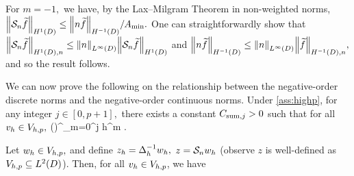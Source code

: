 For $m=-1,$ we have, by the Lax--Milgram Theorem in non-weighted norms, $\NHoD{\Sn \ftilde} \leq \NHmoD{n\ftilde}/\Amin.$ One can straightforwardly show that $\NHnfn{1}{D}{\Sn \ftilde} \leq \NLiD{n} \NHoD{\Sn \ftilde}$ and $\NHmoD{n\ftilde} \leq \NLiD{n} \NHnfn{-1}{D}{\ftilde},$ and so the result follows.
\epf



We can now prove the following  on the relationship between the negative-order discrete norms and the negative-order continuous norms.
\label{lem:negdiscsum}
Under \cref{ass:highp}, for any integer $j \in [0,p+1],$ there exists a constant $C_{\mathrm{sum},j} > 0$ such that for all $v_{h} \in V_{h,p},$
\beqs
{} \leq \mleft(\En\nvar\mright)^{}\Csumj \sum_{m=0}^j h^{m} .
\eeqs
\ele

Let $w_{h} \in V_{h,p},$ and define $z_{h} = \Delta_{h}^{-1} w_{h},$ $z = \mathcal S_{n} w_{h}$ (observe $z$ is well-defined as $\Vhp \subseteq \LtD$). Then, for all $v_{h} \in V_{h,p}$, we have

